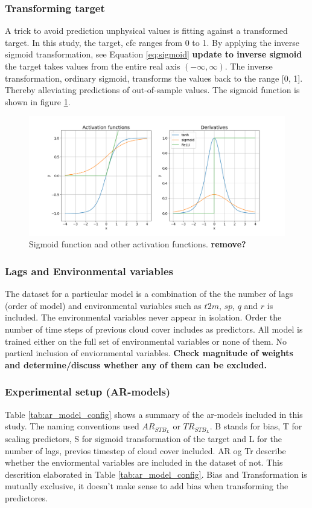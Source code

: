 \subsubsection{Transforming target} \label{sec:transforming_target}
A trick to avoid prediction unphysical values is fitting against a transformed target. In this study, the target, \acrfull{cfc} ranges from 0 to 1. By applying the inverse sigmoid transformation, see Equation \ref{eq:sigmoid} \textbf{update to inverse sigmoid} the target takes values from the entire real axis $(-\infty, \infty)$. 
The inverse transformation, ordinary sigmoid, transforms the values back to the range [0, 1]. Thereby alleviating predictions of out-of-sample values. The sigmoid function is shown in figure \ref{fig:activation_func_plus}. 
\begin{figure}
    \centering
    \includegraphics[scale=0.45]{Chapter3_Method/figs/activation_functions_and_derivatives.png}
    \caption{Sigmoid function and other activation functions. \textbf{remove?}}
    \label{fig:activation_func_plus}
\end{figure}

\subsubsection{Lags and Environmental variables}
The dataset for a particular model is a combination of the the number of lags (order of model) and environmental variables such as $t2m$, $sp$, $q$ and $r$ is included. The environmental variables never appear in isolation.
Order the number of time steps of previous cloud cover includes as predictors. All model is trained either on the full set of environmental variables or none of them. No partical inclusion of enviornmental variables. \textbf{Check magnitude of weights and determine/discuss whether any of them can be excluded.}

\subsubsection{Experimental setup (AR-models)}
Table \ref{tab:ar_model_config} shows a summary of the \acrshort{ar}-models included in this study. The naming conventions used $AR_{STB_L}$ or $TR_{STB_L}$. B stands for bias, T for scaling predictors, S for sigmoid transformation of the target and L for the number of lags, previos timestep of cloud cover included. AR og Tr describe whether the enviormental variables are included in the dataset of not. This descrition elaborated in Table \ref{tab:ar_model_config}. Bias and Transformation is mutually exclusive, it doesn't make sense to add bias when transforming the predictores.


